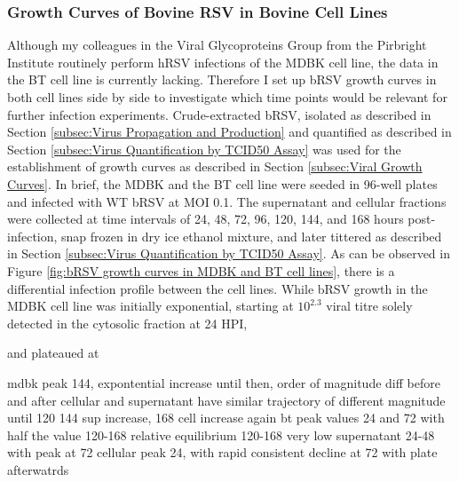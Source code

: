 \subsubsection{Growth Curves of Bovine RSV in Bovine Cell Lines} \label{Growth Curves of Bovine RSV in Bovine Cell Lines}
Although my colleagues in the Viral Glycoproteins Group from the Pirbright Institute routinely perform hRSV infections of the MDBK cell line, the data in the BT cell line is currently lacking. Therefore I set up bRSV growth curves in both cell lines side by side to investigate which time points would be relevant for further infection experiments. Crude-extracted bRSV, isolated as described in Section \ref{subsec:Virus Propagation and Production} and quantified as described in Section \ref{subsec:Virus Quantification by TCID50 Assay} was used for the establishment of growth curves as described in Section \ref{subsec:Viral Growth Curves}. In brief, the MDBK and the BT cell line were seeded in 96-well plates and infected with WT bRSV at MOI 0.1. The supernatant and cellular fractions were collected at time intervals of 24, 48, 72, 96, 120, 144, and 168 hours post-infection, snap frozen in dry ice ethanol mixture, and later tittered as described in Section \ref{subsec:Virus Quantification by TCID50 Assay}. As can be observed in Figure \ref{fig:bRSV growth curves in MDBK and BT cell lines}, there is a differential infection profile between the cell lines. While bRSV growth in the MDBK cell line was initially exponential, starting at \(10^{2.3}\) viral titre solely detected in the cytosolic fraction at 24 HPI, 

and plateaued at


mdbk
    peak 144, expontential increase until then, order of magnitude diff before and after
    cellular and supernatant have similar trajectory of different magnitude until 120
    144 sup increase, 168 cell increase again
bt
    peak values 24 and 72 with half the value 120-168
    relative equilibrium 120-168
    very low supernatant 24-48 with peak at 72
    cellular peak 24, with rapid consistent decline at 72 with plate afterwatrds


